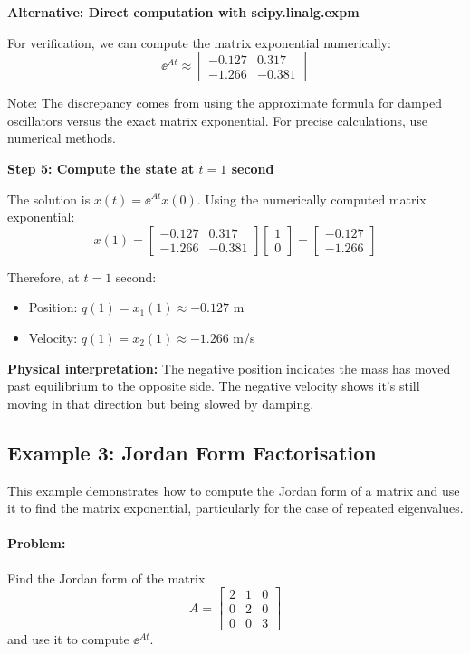 \documentclass[11pt,a4paper]{article}
\begin{document}
\textbf{Alternative: Direct computation with scipy.linalg.expm}

For verification, we can compute the matrix exponential numerically:
\[
\ee^{At} \approx \begin{bmatrix} -0.127 & 0.317 \\ -1.266 & -0.381 \end{bmatrix}
\]

Note: The discrepancy comes from using the approximate formula for damped oscillators versus the exact matrix exponential. For precise calculations, use numerical methods.

\textbf{Step 5: Compute the state at $t=1$ second}

The solution is $x(t) = \ee^{At}x(0)$. Using the numerically computed matrix exponential:
\[
x(1) = \begin{bmatrix} -0.127 & 0.317 \\ -1.266 & -0.381 \end{bmatrix}\begin{bmatrix} 1 \\ 0 \end{bmatrix} = \begin{bmatrix} -0.127 \\ -1.266 \end{bmatrix}
\]

Therefore, at $t = 1$ second:
\begin{itemize}
\item Position: $q(1) = x_1(1) \approx -0.127$ m
\item Velocity: $\dot{q}(1) = x_2(1) \approx -1.266$ m/s
\end{itemize}

\textbf{Physical interpretation:} The negative position indicates the mass has moved past equilibrium to the opposite side. The negative velocity shows it's still moving in that direction but being slowed by damping.


\subsection{Example 3: Jordan Form Factorisation}

This example demonstrates how to compute the Jordan form of a matrix and use it to find the matrix exponential, particularly for the case of repeated eigenvalues.

\paragraph{Problem:}
Find the Jordan form of the matrix
\[
A = \begin{bmatrix} 2 & 1 & 0 \\ 0 & 2 & 0 \\ 0 & 0 & 3 \end{bmatrix}
\]
and use it to compute $\ee^{At}$.
\end{document}
